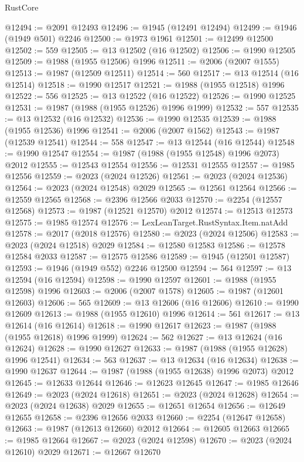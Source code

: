 \begin{lexlean}{RustCore}
\begin{coremodule}
@12494 := @2091 @12493
@12496 := @1945 (@12491 @12494)
@12499 := @1946 (@1949 @501) @2246
@12500 := @1973 @1961
@12501 := @12499 @12500
@12502 := 559
@12505 := @13 @12502 (@16 @12502)
@12506 := @1990 @12505
@12509 := @1988 (@1955 @12506) @1996
@12511 := @2006 (@2007 @1555)
@12513 := @1987 (@12509 @12511)
@12514 := 560
@12517 := @13 @12514 (@16 @12514)
@12518 := @1990 @12517
@12521 := @1988 (@1955 @12518) @1996
@12522 := 556
@12525 := @13 @12522 (@16 @12522)
@12526 := @1990 @12525
@12531 := @1987 (@1988 (@1955 @12526) @1996 @1999)
@12532 := 557
@12535 := @13 @12532 (@16 @12532)
@12536 := @1990 @12535
@12539 := @1988 (@1955 @12536) @1996
@12541 := @2006 (@2007 @1562)
@12543 := @1987 (@12539 @12541)
@12544 := 558
@12547 := @13 @12544 (@16 @12544)
@12548 := @1990 @12547
@12554 := @1987 (@1988 (@1955 @12548) @1996 @2073) @2012
@12555 := @12543 @12554
@12556 := @12531 @12555
@12557 := @1985 @12556
@12559 := @2023 (@2024 @12526)
@12561 := @2023 (@2024 @12536)
@12564 := @2023 (@2024 @12548) @2029
@12565 := @12561 @12564
@12566 := @12559 @12565
@12568 := @2396 @12566 @2033
@12570 := @2254 (@12557 @12568)
@12573 := @1987 (@12521 @12570) @2012
@12574 := @12513 @12573
@12575 := @1985 @12574
@12576 := LexLeanTarget.RustSyntax.Item.natAdd
@12578 := @2017 (@2018 @12576)
@12580 := @2023 (@2024 @12506)
@12583 := @2023 (@2024 @12518) @2029
@12584 := @12580 @12583
@12586 := @12578 @12584 @2033
@12587 := @12575 @12586
@12589 := @1945 (@12501 @12587)
@12593 := @1946 (@1949 @552) @2246 @12500
@12594 := 564
@12597 := @13 @12594 (@16 @12594)
@12598 := @1990 @12597
@12601 := @1988 (@1955 @12598) @1996
@12603 := @2006 (@2007 @1578)
@12605 := @1987 (@12601 @12603)
@12606 := 565
@12609 := @13 @12606 (@16 @12606)
@12610 := @1990 @12609
@12613 := @1988 (@1955 @12610) @1996
@12614 := 561
@12617 := @13 @12614 (@16 @12614)
@12618 := @1990 @12617
@12623 := @1987 (@1988 (@1955 @12618) @1996 @1999)
@12624 := 562
@12627 := @13 @12624 (@16 @12624)
@12628 := @1990 @12627
@12633 := @1987 (@1988 (@1955 @12628) @1996 @12541)
@12634 := 563
@12637 := @13 @12634 (@16 @12634)
@12638 := @1990 @12637
@12644 := @1987 (@1988 (@1955 @12638) @1996 @2073) @2012
@12645 := @12633 @12644
@12646 := @12623 @12645
@12647 := @1985 @12646
@12649 := @2023 (@2024 @12618)
@12651 := @2023 (@2024 @12628)
@12654 := @2023 (@2024 @12638) @2029
@12655 := @12651 @12654
@12656 := @12649 @12655
@12658 := @2396 @12656 @2033
@12660 := @2254 (@12647 @12658)
@12663 := @1987 (@12613 @12660) @2012
@12664 := @12605 @12663
@12665 := @1985 @12664
@12667 := @2023 (@2024 @12598)
@12670 := @2023 (@2024 @12610) @2029
@12671 := @12667 @12670

\end{coremodule}
\end{lexlean}
